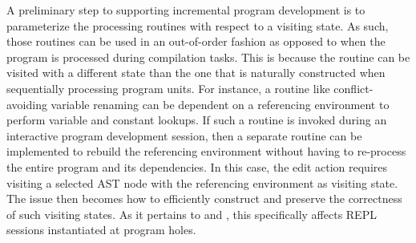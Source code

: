 
A preliminary step to supporting incremental program development is to parameterize the processing routines with respect to a visiting state.
As such, those routines can be used in an out-of-order fashion as opposed to when the program is processed during compilation tasks.
This is because the routine can be visited with a different state than the one that is naturally constructed when sequentially processing program units.
For instance, a routine like conflict-avoiding variable renaming can be dependent on a referencing environment to perform variable and constant lookups.
If such a routine is invoked during an interactive program development session, then a separate routine can be implemented to rebuild the referencing environment without having to re-process the entire program and its dependencies.
In this case, the edit action requires visiting a selected \ac{AST} node with the referencing environment as visiting state.
The issue then becomes how to efficiently construct and preserve the correctness of such visiting states.
As it pertains to \Beluga and \Harpoon, this specifically affects \ac{REPL} sessions instantiated at program holes.

